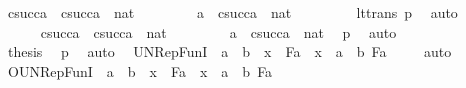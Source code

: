 \begin{isabellebody}
\ {\isachardoublequoteopen}csucc{\isacharparenleft}{\kern0pt}a{\isacharparenright}{\kern0pt}\ {\isacharless}{\kern0pt}\ csucc{\isacharparenleft}{\kern0pt}a{\isacharparenright}{\kern0pt}\ {\isasymoplus}\ nat{\isachardoublequoteclose}\ \isanewline
\ \ \ \ \isamarkupfalse%
\ \isamarkupfalse%
\ {\isachardoublequoteopen}a\ {\isacharless}{\kern0pt}\ csucc{\isacharparenleft}{\kern0pt}a{\isacharparenright}{\kern0pt}\ {\isasymoplus}\ nat{\isachardoublequoteclose}\ \isanewline
\ \ \ \ \ \ \isamarkupfalse%
\ lt{\isacharunderscore}{\kern0pt}trans\ p{}\ \isamarkupfalse%
\ auto\ \isanewline
\ \ \isamarkupfalse%
\ \isanewline
\ \ \ \ \isamarkupfalse%
\ {\isachardoublequoteopen}csucc{\isacharparenleft}{\kern0pt}a{\isacharparenright}{\kern0pt}\ {\isacharequal}{\kern0pt}\ csucc{\isacharparenleft}{\kern0pt}a{\isacharparenright}{\kern0pt}\ {\isasymoplus}\ nat{\isachardoublequoteclose}\ \isanewline
\ \ \ \ \isamarkupfalse%
\ \isamarkupfalse%
\ {\isachardoublequoteopen}a\ {\isacharless}{\kern0pt}\ csucc{\isacharparenleft}{\kern0pt}a{\isacharparenright}{\kern0pt}\ {\isasymoplus}\ nat{\isachardoublequoteclose}\ \isamarkupfalse%
\ p{}\ \isamarkupfalse%
\ auto\ \isanewline
\ \ \isamarkupfalse%
\isanewline
\ \ \isamarkupfalse%
\ \isamarkupfalse%
\ {\isacharquery}{\kern0pt}thesis\ \isamarkupfalse%
\ p{}{}\ \isamarkupfalse%
\ auto\ \isanewline
{}\isamarkupfalse%
%
\endisatagproof
{\isafoldproof}%
%
\isadelimproof
\isanewline
%
\endisadelimproof
\isanewline
\isanewline
{}\isamarkupfalse%
\ UN{\isacharunderscore}{\kern0pt}RepFunI\ {\isacharcolon}{\kern0pt}\ {\isachardoublequoteopen}a\ {\isasymin}\ b\ {\isasymLongrightarrow}\ x\ {\isasymin}\ F{\isacharparenleft}{\kern0pt}a{\isacharparenright}{\kern0pt}\ {\isasymLongrightarrow}\ x\ {\isasymin}\ {\isacharparenleft}{\kern0pt}{\isasymUnion}a\ {\isasymin}\ b{\isachardot}{\kern0pt}\ F{\isacharparenleft}{\kern0pt}a{\isacharparenright}{\kern0pt}{\isacharparenright}{\kern0pt}{\isachardoublequoteclose}\ \isanewline
%
\isadelimproof
\ \ %
\endisadelimproof
%
\isatagproof
{}\isamarkupfalse%
\ auto%
\endisatagproof
{\isafoldproof}%
%
\isadelimproof
\isanewline
%
\endisadelimproof
{}\isamarkupfalse%
\ OUN{\isacharunderscore}{\kern0pt}RepFunI\ {\isacharcolon}{\kern0pt}\ {\isachardoublequoteopen}a\ {\isacharless}{\kern0pt}\ b\ {\isasymLongrightarrow}\ x\ {\isasymin}\ F{\isacharparenleft}{\kern0pt}a{\isacharparenright}{\kern0pt}\ {\isasymLongrightarrow}\ x\ {\isasymin}\ {\isacharparenleft}{\kern0pt}{\isasymUnion}a\ {\isacharless}{\kern0pt}\ b{\isachardot}{\kern0pt}\ F{\isacharparenleft}{\kern0pt}a{\isacharparenright}{\kern0pt}{\isacharparenright}{\kern0pt}{\isachardoublequoteclose}\isanewline

\end{isabellebody}
